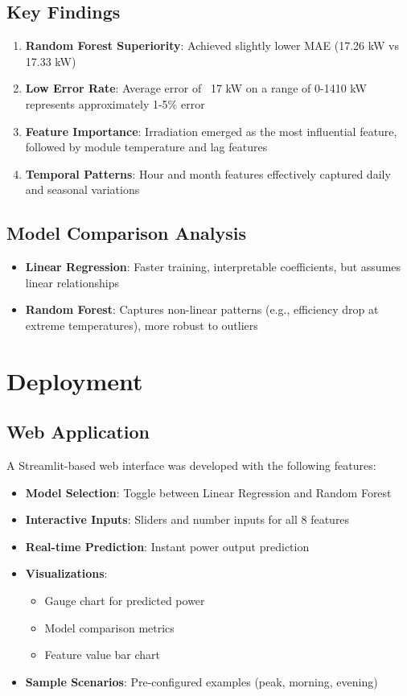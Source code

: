 \documentclass[12pt,a4paper]{article}
\begin{document}
\subsection{Key Findings}
\begin{enumerate}
    \item \textbf{Random Forest Superiority}: Achieved slightly lower MAE (17.26 kW vs 17.33 kW)
    \item \textbf{Low Error Rate}: Average error of ~17 kW on a range of 0-1410 kW represents approximately 1-5\% error
    \item \textbf{Feature Importance}: Irradiation emerged as the most influential feature, followed by module temperature and lag features
    \item \textbf{Temporal Patterns}: Hour and month features effectively captured daily and seasonal variations
\end{enumerate}

\subsection{Model Comparison Analysis}
\begin{itemize}
    \item \textbf{Linear Regression}: Faster training, interpretable coefficients, but assumes linear relationships
    \item \textbf{Random Forest}: Captures non-linear patterns (e.g., efficiency drop at extreme temperatures), more robust to outliers
\end{itemize}

\section{Deployment}

\subsection{Web Application}
A Streamlit-based web interface was developed with the following features:

\begin{itemize}
    \item \textbf{Model Selection}: Toggle between Linear Regression and Random Forest
    \item \textbf{Interactive Inputs}: Sliders and number inputs for all 8 features
    \item \textbf{Real-time Prediction}: Instant power output prediction
    \item \textbf{Visualizations}: 
    \begin{itemize}
        \item Gauge chart for predicted power
        \item Model comparison metrics
        \item Feature value bar chart
    \end{itemize}
    \item \textbf{Sample Scenarios}: Pre-configured examples (peak, morning, evening)
\end{itemize}
\end{document}
